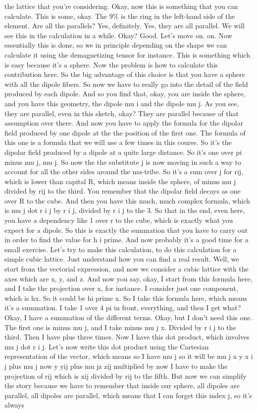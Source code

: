 the lattice that you're considering. Okay, now this is something that you can calculate. This is some, okay. The 9\% is the ring in the left-hand side of the element. Are all the parallels? Yes, definitely. Yes, they are all parallel. We will see this in the calculation in a while. Okay? Good. Let's move on. on. Now essentially this is done, so we in principle depending on the shape we can calculate it using the demagnetizing tensor for instance. This is something which is easy because it's a sphere. Now the problem is how to calculate this contribution here. So the big advantage of this choice is that you have a sphere with all the dipole fibers.
So now we have to really go into the detail of the field produced by each dipole. And so you find that, okay, you are inside the sphere, and you have this geometry, the dipole mu i and the dipole mu j. As you see, they are parallel, even in this sketch, okay? They are parallel because of that assumption over there. And now you have to apply the formula for the dipolar field produced by one dipole at the the position of the first one. The formula of this one is a formula that we will use a few times in this course. So it's the dipolar field produced by a dipole at a quite large distance. So it's one over pi minus mu j, mu j. So now the the substitute j is now moving in such a way to account for all the other sides around the mu-tribe. So it's a sum over j for rij, which is lower than capital R, which means inside the sphere, of minus mu j divided by rij to the third. You remember that the dipolar field decays as one over R to the cube. And then you have this much, much complex formula, which is mu j dot r i j by r i j, divided by r i j to the 3. So that in the end, even here, you have a dependency like 1 over r to the cube, which is exactly what you expect for a dipole. So this is exactly the summation that you have to carry out in order to find the value for h i prime. And now probably it's a good time for a small exercise. Let's try to make this calculation, to do this calculation for a simple cubic lattice. Just understand how you can find a real result. Well, we start from the vectorial expression, and now we consider a cubic lattice with the axes which are x, y, and z. And now you say, okay, I start from this formula here, and I take the projection over x, for instance. I consider just one component, which is hx. So it could be hi prime x. So I take this formula here, which means it's a summation. I take 1 over 4 pi in front, everything, and then I get what? Okay, I have a summation of the different terms. Okay, but I don't need this one. The first one is minus mu j, and I take minus mu j x. Divided by r i j to the third. Then I have plus three times. Now I have this dot product, which involves mu j dot r i j. Let's now write this dot product using the Cartesian representation of the vector, which means so I have mu j so it will be mu j x y x i j plus mu j now y yij plus mu jz zij multiplied by now I have to make the projection of rij which is xij divided by rij to the fifth. But now we can simplify the story because we have to remember that inside our sphere, all dipoles are parallel, all dipoles are parallel, which means that I can forget this index j, so it's always 